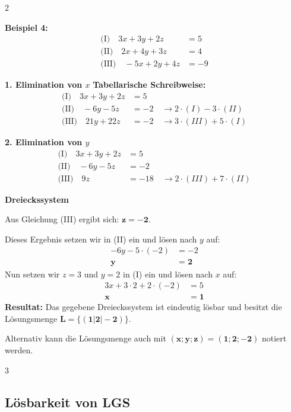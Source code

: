 \documentclass{article}
\begin{document}
\hfill 2

\newpage

\textbf{Beispiel 4:}
\begin{align*}
\text{(I)} \quad 3x + 3y + 2z &= 5\\
\text{(II)} \quad 2x + 4y + 3z &= 4\\
\text{(III)} \quad -5x + 2y + 4z &= -9
\end{align*}

\textbf{1. Elimination von $x$} \hfill \textbf{Tabellarische Schreibweise:}
\begin{align*}
\text{(I)} \quad 3x + 3y + 2z &= 5\\
\text{(II)} \quad -6y - 5z &= -2 \quad \rightarrow 2 \cdot (I) - 3 \cdot (II)\\
\text{(III)} \quad 21y + 22z &= -2 \quad \rightarrow 3 \cdot (III) + 5 \cdot (I)
\end{align*}

\textbf{2. Elimination von $y$}
\begin{align*}
\text{(I)} \quad 3x + 3y + 2z &= 5\\
\text{(II)} \quad -6y - 5z &= -2\\
\text{(III)} \quad 9z &= -18 \quad \rightarrow 2 \cdot (III) + 7 \cdot (II)
\end{align*}

\textbf{Dreieckssystem}

Aus Gleichung (III) ergibt sich: $\mathbf{z = -2}$.

Dieses Ergebnis setzen wir in (II) ein und lösen nach $y$ auf:
\begin{align*}
-6y - 5 \cdot (-2) &= -2\\
\mathbf{y} &= \mathbf{2}
\end{align*}
Nun setzen wir $z = 3$ und $y = 2$ in (I) ein und lösen nach $x$ auf:
\begin{align*}
3x + 3 \cdot 2 + 2 \cdot (-2) &= 5\\
\mathbf{x} &= \mathbf{1}
\end{align*}
\textbf{Resultat:} Das gegebene Dreieckssystem ist eindeutig lösbar und besitzt die Lösungsmenge $\mathbf{L = \{(1|2|-2)\}}$.

Alternativ kann die Lösungsmenge auch mit $\mathbf{(x; y; z) = (1; 2; -2)}$ notiert werden.

\hfill 3

\newpage

\subsection{Lösbarkeit von LGS}
\end{document}
